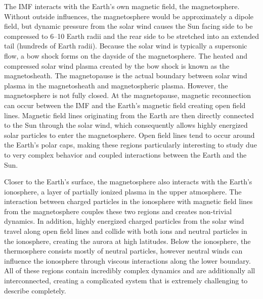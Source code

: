 The IMF interacts with the Earth's own magnetic field, the magnetosphere.  Without outside influences, the magnetosphere would be approximately a dipole field, but dynamic pressure from the solar wind causes the Sun facing side to be compressed to 6--10 Earth radii and the rear side to be stretched into an extended tail (hundreds of Earth radii).  Because the solar wind is typically a supersonic flow, a bow shock forms on the dayside of the magnetosphere.  The heated and compressed solar wind plasma created by the bow shock is known as the magnetosheath.  The magnetopause is the actual boundary between solar wind plasma in the magnetosheath and magnetospheric plasma.  However, the magnetosphere is not fully closed.  At the magnetopause, magnetic reconnection can occur between the IMF and the Earth's magnetic field creating open field lines.  Magnetic field lines originating from the Earth are then directly connected to the Sun through the solar wind, which consequently allows highly energized solar particles to enter the magnetosphere.  Open field lines tend to occur around the Earth's polar caps, making these regions particularly interesting to study due to very complex behavior and coupled interactions between the Earth and the Sun.

Closer to the Earth's surface, the magnetosphere also interacts with the Earth's ionosphere, a layer of partially ionized plasma in the upper atmosphere.  The interaction between charged particles in the ionosphere with magnetic field lines from the magnetosphere couples these two regions and creates non-trivial dynamics.  In addition, highly energized charged particles from the solar wind travel along open field lines and collide with both ions and neutral particles in the ionosphere, creating the aurora at high latitudes.  Below the ionosphere, the thermosphere consists mostly of neutral particles, however neutral winds can influence the ionosphere through viscous interactions along the lower boundary.  All of these regions contain incredibly complex dynamics and are additionally all interconnected, creating a complicated system that is extremely challenging to describe completely.  

